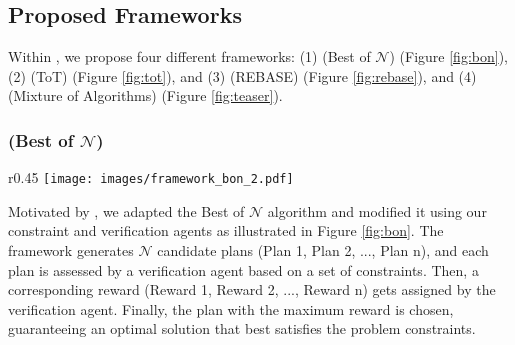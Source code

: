 

\subsection{Proposed Frameworks}
\label{subsec:frameworks}

Within \plangen{}, we propose four different frameworks: (1) \plangen{} (Best of $\mathcal{N}$) (Figure \ref{fig:bon}), (2) \plangen{} (ToT) (Figure \ref{fig:tot}), and (3) \plangen{} (REBASE) (Figure \ref{fig:rebase}), and (4) \plangen{} (Mixture of Algorithms) (Figure \ref{fig:teaser}). 


\subsubsection{\plangen{} (Best of $\mathcal{N}$)}

\begin{wrapfigure}{r}{0.45\textwidth}
    \centering
    \vspace{-20mm}
    \texttt{[image: images/framework\_bon\_2.pdf]}
    \vspace{-3mm}
    \caption{Schematic representation of \plangen{} (Best of $\mathcal{N}$) (BoN).}
    \label{fig:bon}
\end{wrapfigure}Motivated by \citet{brown2024large}, we adapted the Best of $\mathcal{N}$ algorithm and modified it using our constraint and verification agents as illustrated in Figure \ref{fig:bon}.  The framework generates $\mathcal{N}$ candidate plans (Plan 1, Plan 2, ..., Plan n), and each plan is assessed by a verification agent based on a set of constraints. Then, a corresponding reward (Reward 1, Reward 2, ..., Reward n) gets assigned by the verification agent. Finally, the plan with the maximum reward is chosen, guaranteeing an optimal solution that best satisfies the problem constraints.

